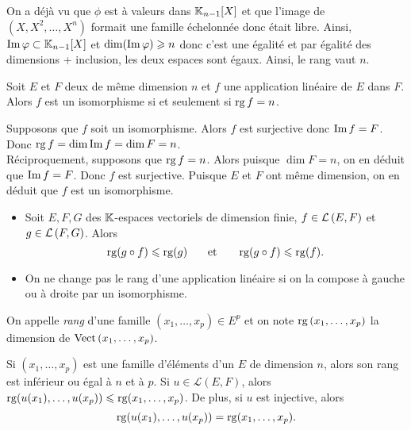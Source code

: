 \documentclass{magnolia}
\begin{document}
  \begin{sol}
  On a déjà vu que $\phi$ est à valeurs dans $\polyK[n-1]$ et que l'image de $(X,X^2,\ldots,X^n)$ formait une famille échelonnée donc était libre. Ainsi, $\im \phi\subset \polyK[n-1]$ et $\dim( \operatorname{Im} \varphi)\geqslant n$ donc c'est une égalité et par égalité des dimensions + inclusion, les deux espaces sont égaux. Ainsi, le rang vaut $n$.
  \end{sol}


\begin{proposition}[utile=2]
Soit $E$ et $F$ deux \Kevs de même dimension $n$ et $f$ une application
linéaire de $E$ dans $F$. Alors $f$ est un isomorphisme si et seulement si
$\operatorname{rg} f=n$.
\end{proposition}
\begin{preuve}
Supposons que $f$ soit un isomorphisme. Alors $f$ est surjective donc
$\operatorname{Im} f=F$. Donc $\operatorname{rg} f=\dim\operatorname{Im} f=\dim F=n$.\\
Réciproquement, supposons que $\operatorname{rg} f=n$. Alors puisque $\dim F=n$, on en
déduit que $\operatorname{Im} f=F$. Donc $f$ est surjective. Puisque $E$ et $F$ ont même
dimension, on en déduit que $f$ est un isomorphisme.
\end{preuve}

\begin{proposition}
\begin{itemize}
\item Soit $E, F, G$ des $\mathbb{K}$-espaces vectoriels de dimension finie, $f\in\mathcal{L}\left(E,F\right)$ et
  $g\in\mathcal{L}\left(F,G\right)$. Alors
  \[\operatorname{rg}(g\circ f)\leqslant\operatorname{rg}(g) \quad\quad\!\text{et}\quad\!\quad \operatorname{rg}(g\circ f)\leqslant\operatorname{rg}(f).\]
\item On ne change pas le rang d'une application linéaire si on la compose à gauche ou à
  droite par un isomorphisme.
\end{itemize}
\end{proposition}

\begin{definition}[utile=-3]
On appelle \emph{rang} d'une famille $(x_1,\ldots,x_p)\in E^p$ et on note
$\operatorname{rg}\left(x_1,\ldots,x_p\right)$ la dimension de $\operatorname{Vect}\left(x_1,\ldots,x_p\right)$.
\end{definition}

\begin{remarques}
\remarque Si $(x_1,\ldots,x_p)$ est une famille d'éléments d'un \Kev $E$ de
  dimension $n$, alors son rang est inférieur ou égal à $n$ et à $p$.
\remarque 
  Si $u\in\mathcal{L}(E,F)$, alors
  $\operatorname{rg}(u(x_1),\ldots,u(x_p))\leqslant\operatorname{rg}(x_1,\ldots,x_p)$. De plus, si $u$ est injective, alors
  \[\operatorname{rg}(u(x_1),\ldots,u(x_p))=\operatorname{rg}(x_1,\ldots,x_p).\]
\end{remarques}
\end{document}
